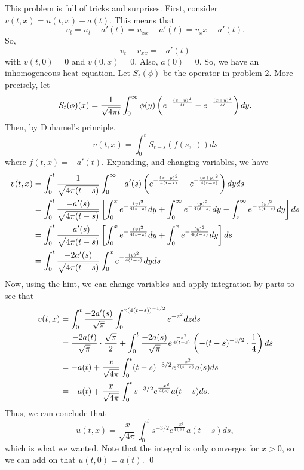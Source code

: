 \documentclass{article}
\begin{document}
\newpage
{} 
 \tri
\hop 
\solution
This problem is full of tricks and surprises. First, consider $v(t,x) = u(t,x) - a(t)$. This means that 
\[v_t = u_t - a'(t) = u_{xx} - a'(t)= v_xx - a'(t).\]
So, 
\[v_t - v_{xx} = -a'(t)\]
with $v(t,0)= 0$ and $v(0,x) = 0$. Also, $a(0)= 0$. So, we have an inhomogeneous heat equation.
\hop 
Let $S_t(\phi)$ be the operator in problem 2. More precisely, let 
\[S_t(\phi)(x) = \frac{1}{\sqrt{4\pi t}} \int_0^\infty \phi(y)\del{e^{-\frac{(x-y)^2}{4t}} - e^{-\frac{(x+y)^2}{4t}}}dy.\] 
Then, by Duhamel's principle, 
\[v(t,x) = \int_0^tS_{t-s}(f(s, \cdot))ds\]
where $f(t,x) = -a'(t)$. Expanding, and changing variables, we have 
\begin{align*}
    v(t,x) &= \int_0^t \frac{1}{\sqrt{4\pi (t-s)}} \int_0^\infty -a'(s)\del{e^{-\frac{(x-y)^2}{4(t-s)}} - e^{-\frac{(x+y)^2}{4(t-s)}}}dy ds \\
    &= \int_0^t \frac{-a'(s)}{\sqrt{4\pi (t-s)}} \sbr{\int_0^x e^{-\frac{(y)^2}{4(t-s)}}dy+\int_0^\infty e^{-\frac{(y)^2}{4(t-s)}}dy-\int_x^\infty e^{-\frac{(y)^2}{4(t-s)}}dy} ds\\
    &= \int_0^t \frac{-a'(s)}{\sqrt{4\pi (t-s)}} \sbr{\int_0^x e^{-\frac{(y)^2}{4(t-s)}}dy+\int_0^x e^{-\frac{(y)^2}{4(t-s)}}dy} ds\\
    &= \int_0^t \frac{-2a'(s)}{\sqrt{4\pi (t-s)}}\int_0^x e^{-\frac{(y)^2}{4(t-s)}}dy ds
\end{align*}
Now, using the hint, we can change variables and apply integration by parts to see that 
\begin{align*}
    v(t,x) &=  \int_0^t \frac{-2a'(s)}{\sqrt{\pi}}\int_0^{x(4(t-s))^{-1/2}} e^{-z^2}dz ds\\
    &= \frac{-2a(t)}{\sqrt{\pi}} \cdot \frac{\sqrt{\pi}}{2}+   \int_0^t \frac{-2a(s)}{\sqrt{\pi}} e^{\frac{-x^2}{4(t-s)}} \del{-(t-s)^{-3/2} \cdot \frac{1}{4}} ds\\
    &= - a(t)+ \frac{x}{\sqrt{4\pi}}\int_0^t (t-s)^{-3/2} e^{\frac{-x^2}{4(t-s)}}a(s) ds\\
    &=  - a(t)+\frac{x}{\sqrt{4\pi}}\int_0^t s^{-3/2} e^{\frac{-x^2}{4(s)}}a(t-s) ds.
\end{align*}
Thus, we can conclude that 
\[u(t,x)=\frac{x}{\sqrt{4\pi}}\int_0^t s^{-3/2} e^{\frac{-x^2}{4(s)}}a(t-s) ds,\]
which is what we wanted. Note that the integral is only converges for $x> 0$, so we can add on that $u(t,0) = a(t)$.  \qed
\newpage
{} 
 \tri
\hop 
\solution
\end{document}

